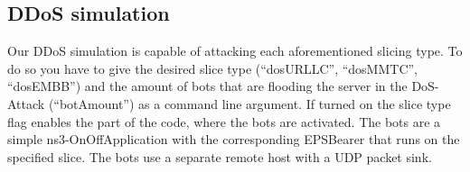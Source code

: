     
    \subsection{DDoS simulation}
    Our DDoS simulation is capable of attacking each aforementioned slicing type. To do so you have to give the desired slice type (``dosURLLC'', ``dosMMTC'', ``dosEMBB'') and the amount of bots that are flooding the server in the DoS-Attack (``botAmount'') as a command line argument. If turned on the slice type flag enables the part of the code, where the bots are activated. 
    The bots are a simple ns3-OnOffApplication with the corresponding EPSBearer that runs on the specified slice.
    The bots use a separate remote host with a UDP packet sink.    